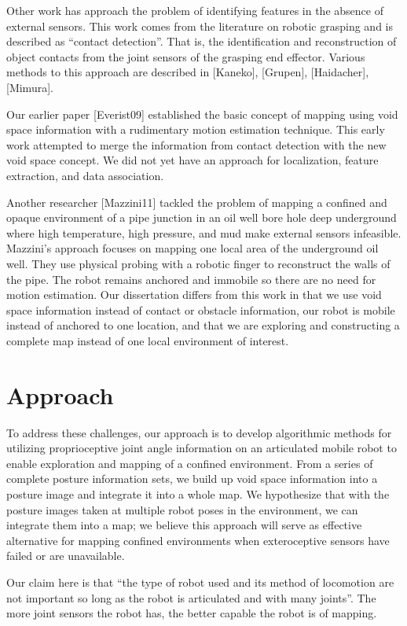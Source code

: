 Other work has approach the problem of identifying features in the absence of external sensors. This work comes from the literature on robotic grasping and is described as “contact detection”. That is, the identification and reconstruction of object contacts from the joint sensors of the grasping end effector. Various methods to this approach are described in [Kaneko], [Grupen], [Haidacher], [Mimura].

Our earlier paper [Everist09] established the basic concept of mapping using void space information with a rudimentary motion estimation technique. This early work attempted to merge the information from contact detection with the new void space concept. We did not yet have an approach for localization, feature extraction, and data association.

Another researcher [Mazzini11] tackled the problem of mapping a confined and opaque environment of a pipe junction in an oil well bore hole deep underground where high temperature, high pressure, and mud make external sensors infeasible. Mazzini's approach focuses on mapping one local area of the underground oil well. They use physical probing with a robotic finger to reconstruct the walls of the pipe. The robot remains anchored and immobile so there are no need for motion estimation. Our dissertation differs from this work in that we use void space information instead of contact or obstacle information, our robot is mobile instead of anchored to one location, and that we are exploring and constructing a complete map instead of one local environment of interest.

\section{Approach}
\label{approach}

To address these challenges, our approach is to develop algorithmic methods for utilizing proprioceptive joint angle information on an articulated mobile robot to enable exploration and mapping of a confined environment. From a series of complete posture information sets, we build up void space information into a posture image and integrate it into a whole map. We hypothesize that with the posture images taken at multiple robot poses in the environment, we can integrate them into a map; we believe this approach will serve as effective alternative for mapping confined environments when exteroceptive sensors have failed or are unavailable.

Our claim here is that “the type of robot used and its method of locomotion are not important so long as the robot is articulated and with many joints”. The more joint sensors the robot has, the better capable the robot is of mapping.


